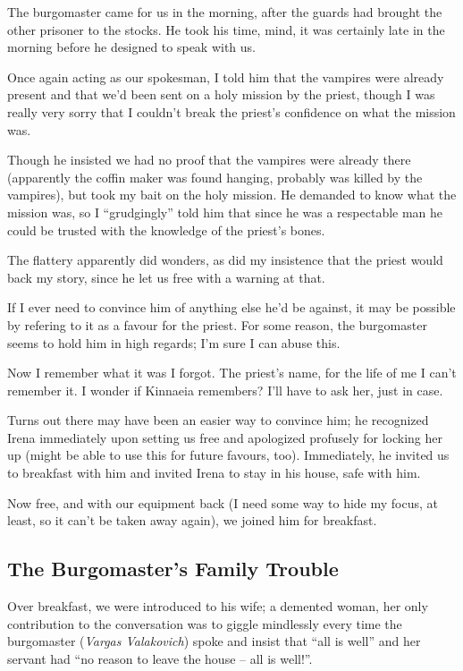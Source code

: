 
The burgomaster came for us in the morning, after the guards had brought the other prisoner to the stocks. He took his time, mind, it was certainly late in the morning before he designed to speak with us.

Once again acting as our spokesman, I told him that the vampires were already present and that we'd been sent on a holy mission by the priest, though I was really very sorry that I couldn't break the priest's confidence on what the mission was.

Though he insisted we had no proof that the vampires were already there (apparently the coffin maker was found hanging, probably was killed by the vampires), but took my bait on the holy mission. He demanded to know what the mission was, so I ``grudgingly'' told him that since he was a respectable man he could be trusted with the knowledge of the priest's bones.

The flattery apparently did wonders, as did my insistence that the priest would back my story, since he let us free with a warning at that.

If I ever need to convince him of anything else he'd be against, it may be possible by refering to it as a favour for the priest. For some reason, the burgomaster seems to hold him in high regards; I'm sure I can abuse this.

Now I remember what it was I forgot. The priest's name, for the life of me I can't remember it. I wonder if Kinnaeia remembers? I'll have to ask her, just in case. 

Turns out there may have been an easier way to convince him; he recognized Irena immediately upon setting us free and apologized profusely for locking her up (might be able to use this for future favours, too). Immediately, he invited us to breakfast with him and invited Irena to stay in his house, safe with him.

Now free, and with our equipment back (I need some way to hide my focus, at least, so it can't be taken away again), we joined him for breakfast.

\subsection*{The Burgomaster's Family Trouble}
Over breakfast, we were introduced to his wife; a demented woman, her only contribution to the conversation was to giggle mindlessly every time the burgomaster (\emph{Vargas Valakovich}) spoke and insist that ``all is well'' and her servant had ``no reason to leave the house -- all is well!''.

